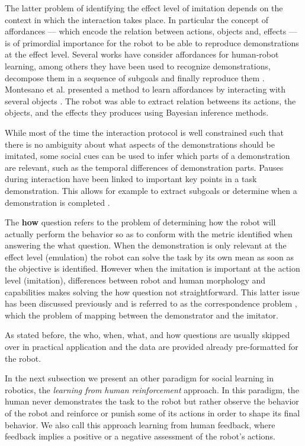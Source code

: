 The latter problem of identifying the effect level of imitation depends on the context in which the interaction takes place. In particular the concept of affordances \cite{gibson1986ecological} --- which encode the relation between actions, objects and, effects --- is of primordial importance for the robot to be able to reproduce demonstrations at the effect level. Several works have consider affordances for human-robot learning, among others they have been used to recognize demonstrations, decompose them in a sequence of subgoals and finally reproduce them \cite{macl07affimit}. Montesano et al. presented a method to learn affordances by interacting with several objects \cite{montesano2008learning}. The robot was able to extract relation betweens its actions, the objects, and the effects they produces using Bayesian inference methods.

While most of the time the interaction protocol is well constrained such that there is no ambiguity about what aspects of the demonstrations should be imitated, some social cues can be used to infer which parts of a demonstration are relevant, such as the temporal differences of demonstration parts. Pauses during interaction have been linked to important key points in a task demonstration. This allows for example to extract subgoals or determine when a demonstration is completed \cite{theofilis2013temporal}.

The \textbf{how} question refers to the problem of determining how the robot will actually perform the behavior so as to conform with the metric identified when answering the what question. When the demonstration is only relevant at the effect level (emulation) the robot can solve the task by its own mean as soon as the objective is identified. However when the imitation is important at the action level (imitation), differences between robot and human morphology and capabilities makes solving the how question not straightforward. This latter issue has been discussed previously and is referred to as the correspondence problem \cite{nehaniv2002correspondence}, which the problem of mapping between the demonstrator and the imitator.

\transition

As stated before, the who, when, what, and how questions are usually skipped over in practical application and the data are provided already pre-formatted for the robot.

In the next subsection we present an other paradigm for social learning in robotics, the \emph{learning from human reinforcement} approach. In this paradigm, the human never demonstrates the task to the robot but rather observe the behavior of the robot and reinforce or punish some of its actions in order to shape its final behavior. We also call this approach learning from human feedback, where feedback implies a positive or a negative assessment of the robot's actions.

